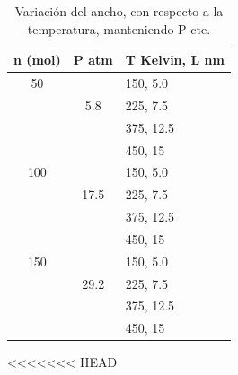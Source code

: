 \documentclass[]{article}
\begin{document}
\begin{table}
 \centering
 \begin{tabular}{|c|c|l|} \hline
  n (mol)&      P atm      &    T Kelvin, L nm\\ \hline
   50    &                 &             150, 5.0\\
         &  5.8            &             225, 7.5\\
         &                 &             375, 12.5\\
         &                 &             450, 15\\ \hline
   100   &                 &             150, 5.0\\ 
         &  17.5           &             225, 7.5\\
         &                 &             375, 12.5\\ 
         &                 &             450, 15\\ \hline                
   150   &                 &              150, 5.0\\ 
         &  29.2           &              225, 7.5\\
         &                 &              375, 12.5\\ 
         &                 &              450, 15\\ \hline          

 \end{tabular}
 \caption{\label{tab:V.Ancho} Variación del ancho, con respecto a la temperatura, manteniendo P cte.}    
 \end{table}



<<<<<<< HEAD
\end{document}
